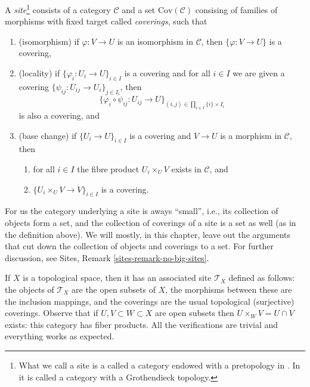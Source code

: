 \begin{definition}
\label{definition-site}
A {\it site}\footnote{What we call a site is a called a category endowed with
a pretopology in \cite[Exposee II, Definition 1.3]{SGA4}.
In \cite{ArtinTopologies} it is called a category with a Grothendieck
topology.} consists of a category $\mathcal{C}$ and a set
$\text{Cov}(\mathcal{C})$ consising of families of morphisms with fixed target
called {\it coverings}, such that
\begin{enumerate}
\item (isomorphism) if $\varphi : V \to U$ is an isomorphism in $\mathcal{C}$,
then $\{\varphi : V \to U\}$ is a covering,
\item (locality) if $\{\varphi_i : U_i \to U\}_{i\in I}$ is a covering and
for all $i \in I$ we are given a covering
$\{\psi_{ij} : U_{ij} \to U_i \}_{j\in I_i}$, then
$$
\{
\varphi_i \circ \psi_{ij} : U_{ij} \to U
\}_{(i,j)\in \prod_{i\in I} \{i\} \times I_i}
$$
is also a covering, and
\item (base change) if $\{U_i \to U\}_{i\in I}$
is a covering and $V \to U$ is a morphism in $\mathcal{C}$, then
\begin{enumerate}
\item for all $i \in I$ the fibre product
$U_i \times_U V$ exists in $\mathcal{C}$, and
\item $\{U_i \times_U V \to V\}_{i\in I}$ is a covering.
\end{enumerate}
\end{enumerate}
\end{definition}

\noindent
For us the category underlying a site is aways ``small'', i.e., its
collection of objects form a set, and the collection of coverings of
a site is a set as well (as in the definition above). We will mostly,
in this chapter, leave out the arguments that cut down the collection
of objects and coverings to a set. For further discussion, see
Sites, Remark \ref{sites-remark-no-big-sites}.

\begin{example}
\label{example-site-topological-space}
If $X$ is a topological space, then it has an associated site $\mathcal{T}_X$
defined as follows: the objects of $\mathcal{T}_X$ are the open subsets of $X$,
the morphisms between these are the inclusion mappings, and the coverings are
the usual topological (surjective) coverings. Observe that if
$U, V \subset W \subset X$ are open subsets then $U \times_W V = U \cap V$
exists: this category has fiber products. All the verifications are trivial and
everything works as expected.
\end{example}





